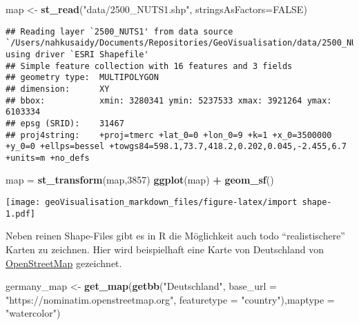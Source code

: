 \documentclass[]{article}
\newenvironment{Shaded}{\begin{snugshade}}{\end{snugshade}}
\newcommand{\DataTypeTok}[1]{\textcolor[rgb]{0.13,0.29,0.53}{#1}}
\newcommand{\DecValTok}[1]{\textcolor[rgb]{0.00,0.00,0.81}{#1}}
\newcommand{\KeywordTok}[1]{\textcolor[rgb]{0.13,0.29,0.53}{\textbf{#1}}}
\newcommand{\NormalTok}[1]{#1}
\newcommand{\OperatorTok}[1]{\textcolor[rgb]{0.81,0.36,0.00}{\textbf{#1}}}
\newcommand{\OtherTok}[1]{\textcolor[rgb]{0.56,0.35,0.01}{#1}}
\newcommand{\StringTok}[1]{\textcolor[rgb]{0.31,0.60,0.02}{#1}}
\begin{document}
\begin{Shaded}
\begin{Highlighting}[]
\NormalTok{map <-}\StringTok{ }\KeywordTok{st_read}\NormalTok{(}\StringTok{"data/2500_NUTS1.shp"}\NormalTok{, }\DataTypeTok{stringsAsFactors=}\OtherTok{FALSE}\NormalTok{)}
\end{Highlighting}
\end{Shaded}

\begin{verbatim}
## Reading layer `2500_NUTS1' from data source `/Users/nahkusaidy/Documents/Repositories/GeoVisualisation/data/2500_NUTS1.shp' using driver `ESRI Shapefile'
## Simple feature collection with 16 features and 3 fields
## geometry type:  MULTIPOLYGON
## dimension:      XY
## bbox:           xmin: 3280341 ymin: 5237533 xmax: 3921264 ymax: 6103334
## epsg (SRID):    31467
## proj4string:    +proj=tmerc +lat_0=0 +lon_0=9 +k=1 +x_0=3500000 +y_0=0 +ellps=bessel +towgs84=598.1,73.7,418.2,0.202,0.045,-2.455,6.7 +units=m +no_defs
\end{verbatim}

\begin{Shaded}
\begin{Highlighting}[]
\NormalTok{map =}\StringTok{ }\KeywordTok{st_transform}\NormalTok{(map,}\DecValTok{3857}\NormalTok{)}
\KeywordTok{ggplot}\NormalTok{(map) }\OperatorTok{+}\StringTok{ }\KeywordTok{geom_sf}\NormalTok{()}
\end{Highlighting}
\end{Shaded}

\texttt{[image: geoVisualisation\_markdown\_files/figure-latex/import shape-1.pdf]}

Neben reinen Shape-Files gibt es in R die Möglichkeit auch todo
``realistischere'' Karten zu zeichnen. Hier wird beispielhaft eine Karte
von Deutschland von \href{https://www.openstreetmap.de}{OpenStreetMap}
gezeichnet.

\begin{Shaded}
\begin{Highlighting}[]
\NormalTok{germany_map <-}\StringTok{ }\KeywordTok{get_map}\NormalTok{(}\KeywordTok{getbb}\NormalTok{(}\StringTok{"Deutschland"}\NormalTok{, }\DataTypeTok{base_url =} \StringTok{"https://nominatim.openstreetmap.org"}\NormalTok{, }\DataTypeTok{featuretype =} \StringTok{"country"}\NormalTok{),}\DataTypeTok{maptype =} \StringTok{"watercolor"}\NormalTok{)}
\end{Highlighting}
\end{Shaded}
\end{document}
